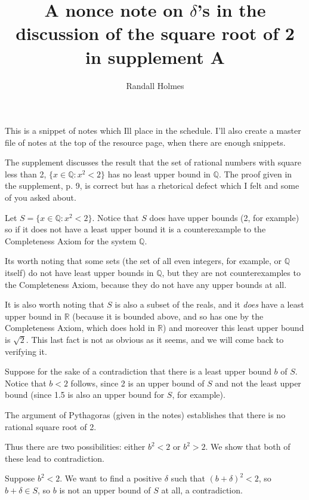 \documentclass[12pt]{article}
\title{A nonce note on $\delta$'s in the discussion of the square root of 2 in supplement A}
\author{Randall Holmes}
\begin{document}
\maketitle

\maketitle

This is a snippet of notes which Ill place in the schedule.  I'll also create a master file of notes at the top of the resource page, when there are enough snippets.

The supplement discusses the result that the set of rational numbers with square less than 2, $\{x \in \mathbb Q:x^2<2\}$ has no least upper bound in $\mathbb Q$.  The proof given in the supplement, p. 9, is correct but has a rhetorical defect which I felt and some of you asked about.

Let $S=\{x \in \mathbb Q:x^2<2\}$.  Notice that $S$ does have upper bounds (2, for example) so if it does not have a least upper bound it is a counterexample to the Completeness Axiom
for the system $\mathbb Q$.

Its worth noting that some sets (the set of all even integers, for example, or $\mathbb Q$ itself) do not have least upper bounds in $\mathbb Q$, but they are not counterexamples to the Completeness Axiom, because they do not have any upper bounds at all.

It is also worth noting that $S$ is also a subset of the reals, and it {\em does\/} have a least upper bound in $\mathbb R$ (because it is bounded above, and so has one by the Completeness Axiom, which does hold in $\mathbb R$) and moreover this least upper bound is $\sqrt 2$.  This last fact is not as obvious as it seems, and we will come back to verifying it.

Suppose for the sake of a contradiction that there is a least upper bound $b$ of $S$.  Notice that $b<2$ follows, since 2 is an upper bound of $S$ and not the least upper bound
(since 1.5 is also an upper bound for $S$, for example).

The argument of Pythagoras (given in the notes) establishes that there is no rational square root of 2.

Thus there are two possibilities:  either $b^2<2$ or $b^2>2$.  We show that both of these lead to contradiction.

Suppose $b^2<2$.  We want to find a positive $\delta$ such that $(b+\delta)^2<2$, so $b+\delta \in S$, so $b$ is not an upper bound of $S$ at all, a contradiction.
\end{document}

